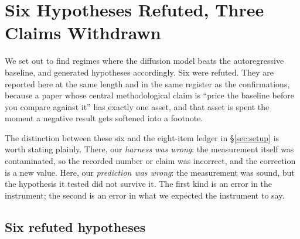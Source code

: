 \section{Six Hypotheses Refuted, Three Claims Withdrawn}
\label{sec:negative}

We set out to find regimes where the diffusion model beats the autoregressive
baseline, and generated hypotheses accordingly. Six were refuted. They are
reported here at the same length and in the same register as the
confirmations, because a paper whose central methodological claim is ``price
the baseline before you compare against it'' has exactly one asset, and that
asset is spent the moment a negative result gets softened into a footnote.

The distinction between these six and the eight-item ledger in
\S\ref{sec:setup} is worth stating plainly. There, our \emph{harness was
wrong}: the measurement itself was contaminated, so the recorded number or
claim was incorrect, and the correction is a new value. Here, our
\emph{prediction was wrong}: the measurement was sound, but the hypothesis it
tested did not survive it. The first kind is an error in the instrument; the
second is an error in what we expected the instrument to say.

\subsection{Six refuted hypotheses}

